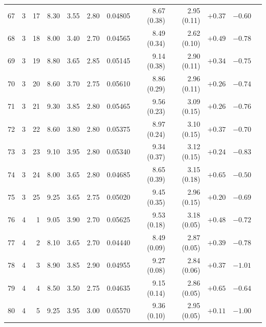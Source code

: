\begin{longtable}{@{}rrrrrrrrrrrr@{}}
67 & 3 & 17 & \num{8.30} & \num{3.55} & \num{2.80} & \num{0.04805} & \num{8.67} (\num{0.38}) & \num{2.95} (\num{0.11}) & $+\num{0.37}$ & $-\num{0.60}$ &  \\
68 & 3 & 18 & \num{8.00} & \num{3.40} & \num{2.70} & \num{0.04565} & \num{8.49} (\num{0.34}) & \num{2.62} (\num{0.10}) & $+\num{0.49}$ & $-\num{0.78}$ &  \\
69 & 3 & 19 & \num{8.80} & \num{3.65} & \num{2.85} & \num{0.05145} & \num{9.14} (\num{0.38}) & \num{2.90} (\num{0.11}) & $+\num{0.34}$ & $-\num{0.75}$ &  \\
70 & 3 & 20 & \num{8.60} & \num{3.70} & \num{2.75} & \num{0.05610} & \num{8.86} (\num{0.29}) & \num{2.96} (\num{0.11}) & $+\num{0.26}$ & $-\num{0.74}$ &  \\
71 & 3 & 21 & \num{9.30} & \num{3.85} & \num{2.80} & \num{0.05465} & \num{9.56} (\num{0.23}) & \num{3.09} (\num{0.15}) & $+\num{0.26}$ & $-\num{0.76}$ &  \\
72 & 3 & 22 & \num{8.60} & \num{3.80} & \num{2.80} & \num{0.05375} & \num{8.97} (\num{0.24}) & \num{3.10} (\num{0.15}) & $+\num{0.37}$ & $-\num{0.70}$ &  \\
73 & 3 & 23 & \num{9.10} & \num{3.95} & \num{2.80} & \num{0.05340} & \num{9.34} (\num{0.37}) & \num{3.12} (\num{0.15}) & $+\num{0.24}$ & $-\num{0.83}$ &  \\
74 & 3 & 24 & \num{8.00} & \num{3.65} & \num{2.80} & \num{0.04685} & \num{8.65} (\num{0.39}) & \num{3.15} (\num{0.18}) & $+\num{0.65}$ & $-\num{0.50}$ &  \\
75 & 3 & 25 & \num{9.25} & \num{3.65} & \num{2.75} & \num{0.05020} & \num{9.45} (\num{0.35}) & \num{2.96} (\num{0.15}) & $+\num{0.20}$ & $-\num{0.69}$ &  \\
76 & 4 & 1 & \num{9.05} & \num{3.90} & \num{2.70} & \num{0.05625} & \num{9.53} (\num{0.18}) & \num{3.18} (\num{0.05}) & $+\num{0.48}$ & $-\num{0.72}$ &  \\
77 & 4 & 2 & \num{8.10} & \num{3.65} & \num{2.70} & \num{0.04440} & \num{8.49} (\num{0.09}) & \num{2.87} (\num{0.05}) & $+\num{0.39}$ & $-\num{0.78}$ &  \\
78 & 4 & 3 & \num{8.90} & \num{3.85} & \num{2.90} & \num{0.04955} & \num{9.27} (\num{0.08}) & \num{2.84} (\num{0.06}) & $+\num{0.37}$ & $-\num{1.01}$ &  \\
79 & 4 & 4 & \num{8.50} & \num{3.50} & \num{2.75} & \num{0.04635} & \num{9.15} (\num{0.14}) & \num{2.86} (\num{0.05}) & $+\num{0.65}$ & $-\num{0.64}$ &  \\
80 & 4 & 5 & \num{9.25} & \num{3.95} & \num{3.00} & \num{0.05570} & \num{9.36} (\num{0.10}) & \num{2.95} (\num{0.05}) & $+\num{0.11}$ & $-\num{1.00}$ &  \\

\end{longtable}

